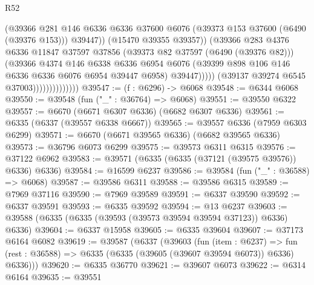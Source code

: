 \begin{lexlean}{R52}
\begin{coremodule}
                                        (@39366
                                          @281
                                          @146
                                          @6336
                                          @6336
                                          @37600
                                          @6076
                                          (@39373 @153 @37600 (@6490 (@39376 @153)))
                                          @39447))
                                      (@15470 @39355 @39357))
                                    (@39366
                                      @283
                                      @4376
                                      @6336
                                      @11847
                                      @37597
                                      @37856
                                      (@39373 @82 @37597 (@6490 (@39376 @82)))
                                      (@39366
                                        @4374
                                        @146
                                        @6338
                                        @6336
                                        @6954
                                        @6076
                                        (@39399 @898 @106 @146 @6336 @6336 @6076 @6954 @39447 @6958)
                                        @39447)))))
                              (@39137 @39274 @6545 @37003))))))))))))))
@39547 := (f : @6296) -> @6068
@39548 := @6344 @6068
@39550 := @39548 (fun ("_" : @36764) => @6068)
@39551 := @39550 @6322
@39557 := @6670 (@6671 @6307 @6336) (@6682 @6307 @6336)
@39561 := @6335 (@6337 (@39557 @6338 @6667))
@39565 := @39557 @6336 (@7959 @6303 @6299)
@39571 := @6670 (@6671 @39565 @6336) (@6682 @39565 @6336)
@39573 := @36796 @6073 @6299
@39575 := @39573 @6311 @6315
@39576 := @37122 @6962
@39583 := @39571 (@6335 (@6335 (@37121 (@39575 @39576)) @6336) @6336)
@39584 := @16599 @6237
@39586 := @39584 (fun ("_" : @36588) => @6068)
@39587 := @39586 @6311
@39588 := @39586 @6315
@39589 := @7969 @37116
@39590 := @7969 @39589
@39591 := @6337 @39590
@39592 := @6337 @39591
@39593 := @6335 @39592
@39594 := @13 @6237
@39603 := @39588 (@6335 (@6335 (@39593 (@39573 @39594 @39594 @37123)) @6336) @6336)
@39604 := @6337 @15958
@39605 := @6335 @39604
@39607 := @37173 @6164 @6082
@39619 := @39587
    (@6337
      (@39603
        (fun (item : @6237) =>
        fun (rest : @36588) => @6335 (@6335 (@39605 (@39607 @39594 @6073)) @6336) @6336)))
@39620 := @6335 @36770
@39621 := @39607 @6073
@39622 := @6314 @6164
@39635 := @39551

\end{coremodule}
\end{lexlean}
